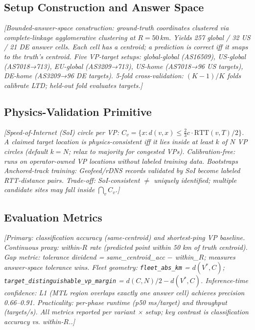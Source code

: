 \subsection{Setup Construction and Answer Space}
\label{sec:setup-construction}
\textit{[Bounded-answer-space construction: ground-truth coordinates clustered via complete-linkage
agglomerative clustering at $R = 50$\,km. Yields 257 global / 32 US / 21 DE answer cells.
Each cell has a centroid; a prediction is correct iff it snaps to the truth's centroid.
Five VP-target setups: global-global (AS16509), US-global (AS7018→713), EU-global (AS3209→713),
US-home (AS7018→96 US targets), DE-home (AS3209→96 DE targets).
5-fold cross-validation: $(K-1)/K$ folds calibrate LTD; held-out fold evaluates targets.]}

\subsection{Physics-Validation Primitive}
\label{sec:setup-soi}
\textit{[Speed-of-Internet (SoI) circle per VP: $C_v = \{x : d(v,x) \leq \tfrac{2}{3}c \cdot \text{RTT}(v,T)/2\}$.
A claimed target location is \emph{physics-consistent} iff it lies inside at least $k$ of $N$ VP circles
(default $k = N$; relax to majority for congested VPs).
Calibration-free: runs on operator-owned VP locations without labeled training data.
Bootstraps Anchored-track training: Geofeed/rDNS records validated by SoI become labeled RTT-distance pairs.
Trade-off: SoI-consistent $\neq$ uniquely identified; multiple candidate sites may fall inside $\bigcap_v C_v$.]}

\subsection{Evaluation Metrics}
\label{sec:setup-metrics}
\textit{[Primary: classification accuracy (same-centroid) and shortest-ping VP baseline.
Continuous proxy: within-$R$ rate (predicted point within 50 km of truth centroid).
Gap metric: \emph{tolerance dividend} = same\_centroid\_acc $-$ within\_$R$; measures answer-space tolerance wins.
Fleet geometry: \texttt{fleet\_abs\_km} = $d(V^*, C)$; \texttt{target\_distinguishable\_vp\_margin} = $d(C,N)/2 - d(V^*,C)$.
Inference-time confidence: L1 (MTL region overlaps exactly one answer cell) achieves precision 0.66--0.91.
Practicality: per-phase runtime (p50 ms/target) and throughput (targets/s).
All metrics reported per variant × setup; key contrast is classification accuracy vs. within-$R$..]}
